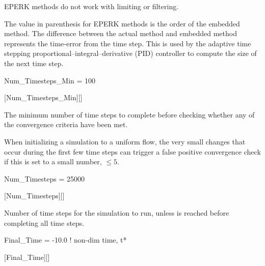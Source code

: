 \begin{nmldescbody}
\NOTE
EPERK methods do not work with limiting or filtering.

\NOTE
The value in parenthesis for EPERK methods is the order of the embedded method.
%
The difference between the actual method and embedded method represents the
time-error from the time step.
%
This is used by the adaptive time stepping proportional–integral–derivative
(PID) controller to compute the size of the next time step.
\end{nmldescbody}


\begin{nmldescitem}
Num_Timesteps_Min = 100
\end{nmldescitem}
[Num\_Timesteps\_Min][]

\begin{nmldescbody}
The minimum number of time steps to complete before checking whether any of
the convergence criteria have been met.

\NOTE When initializing a simulation to a uniform flow, the very
small changes that occur during the first few time steps can trigger a false
positive convergence check if this is set to a small number,
\forexample $\leq5$.
\end{nmldescbody}


\begin{nmldescitem}
Num_Timesteps = 25000
\end{nmldescitem}
[Num\_Timesteps][]

\begin{nmldescbody}
Number of time steps for the simulation to run, unless
is reached before completing all time steps.
\end{nmldescbody}


\begin{nmldescitem}
Final_Time = -10.0  ! non-dim time, t*
\end{nmldescitem}
[Final\_Time][]

